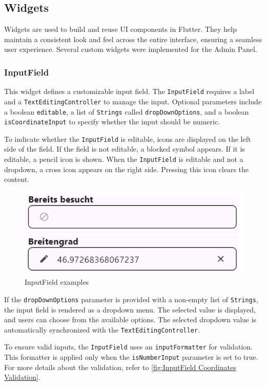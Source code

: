 \subsection{Widgets}
Widgets are used to build and reuse UI components in Flutter. They help maintain a consistent look and feel across the entire interface, ensuring a seamless user experience. Several custom widgets were implemented for the Admin Panel.

\subsubsection{InputField}
\label{fig:InputField} 
This widget defines a customizable input field. The \texttt{InputField} requires a label and a \texttt{TextEditingController} to manage the input. Optional parameters include a boolean \texttt{editable}, a list of \texttt{Strings} called \texttt{dropDownOptions}, and a boolean \texttt{isCoordinateInput} to specify whether the input should be numeric.\blankLine

To indicate whether the \texttt{InputField} is editable, icons are displayed on the left side of the field. If the field is not editable, a blocked symbol appears. If it is editable, a pencil icon is shown. When the \texttt{InputField} is editable and not a dropdown, a cross icon appears on the right side. Pressing this icon clears the content.

\begin{figure}[H]
    \centering
    \includegraphics[width=0.4\linewidth]{images/AdminPanel/InputFieldExamples.png}
    \caption{InputField examples}
\end{figure}

If the \texttt{dropDownOptions} parameter is provided with a non-empty list of \texttt{Strings}, the input field is rendered as a dropdown menu. The selected value is displayed, and users can choose from the available options. The selected dropdown value is automatically synchronized with the \texttt{TextEditingController}. \blankLine

To ensure valid inputs, the \texttt{InputField} uses an \texttt{inputFormatter} for validation. This formatter is applied only when the \texttt{isNumberInput} parameter is set to true. For more details about the validation, refer to \ref{fig:InputField Coordinates Validation}.


